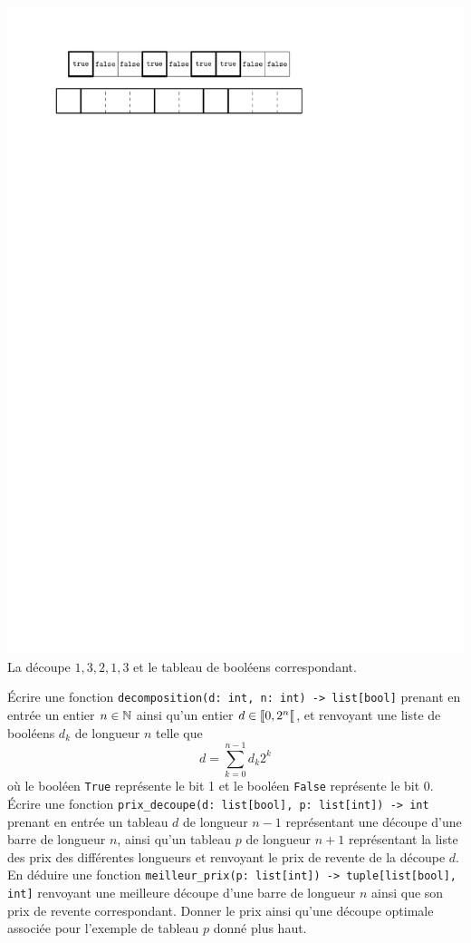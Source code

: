 \documentclass{magnoliaold}
\begin{document}
\begin{center}
\includegraphics{../../commun/images/info-cours-algo-decoupe}\\
La découpe $1, 3, 2, 1, 3$ et le tableau de booléens correspondant.
\end{center}

\begin{questions}
\question Écrire une fonction \verb!decomposition(d: int, n: int) -> list[bool]!
  prenant en entrée un entier $n\in\mathbb{N}$ ainsi qu'un entier $d\in\left\llbracket 0,2^n\right\llbracket$,
  et renvoyant une liste de booléens $d_k$ de longueur $n$ telle que
  \[d=\sum_{k=0}^{n-1} d_k 2^k\]
  où le booléen \verb!True! représente le bit 1 et le booléen \verb!False! représente
  le bit 0.
\question Écrire une fonction \verb!prix_decoupe(d: list[bool], p: list[int]) -> int!
  prenant en entrée un tableau $d$ de longueur $n-1$ représentant une découpe d'une
  barre de longueur $n$, ainsi qu'un tableau $p$ de longueur $n+1$ représentant la
  liste des prix des différentes longueurs et renvoyant le prix de revente de la découpe
  $d$.
\question En déduire une fonction \verb!meilleur_prix(p: list[int]) -> tuple[list[bool], int]! renvoyant une meilleure découpe d'une barre de longueur $n$ ainsi que son prix
de revente correspondant.
\question Donner le prix ainsi qu'une découpe optimale associée pour l'exemple de tableau
  $p$ donné plus haut. 
\end{questions}
\end{document}
